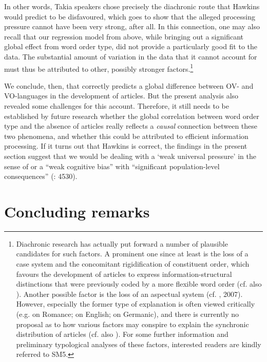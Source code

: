 \documentclass[output=paper]{langsci/langscibook}
\begin{document}
In other words, Takia speakers chose precisely the diachronic route that Hawkins would predict to be disfavoured, which goes to show that the alleged processing pressure cannot have been very strong, after all. In this connection, one may also recall that our regression model from above, while bringing out a significant global effect from word order type, did not provide a particularly good fit to the data. The substantial amount of variation in the data that it cannot account for must thus be attributed to other, possibly stronger factors.\footnote{Diachronic research has actually put forward a number of plausible candidates for such factors. A prominent one since at least \citet{Vennemann1975} is the loss of a case system and the concomitant rigidification of constituent order, which favours the development of articles to express information-structural distinctions that were previously coded by a more flexible word order (cf. also \citealt{Hawkins2004,HewsonBubenik2006,Fischer2010,CarlierLamiroy2014}). Another possible factor is the loss of an aspectual system (cf. \citealt{Abraham1997,Leiss2000}, 2007). However, especially the former type of explanation is often viewed critically (e.g. \citealt{Selig1992} on Romance;  \citealt{McCollMillar2000} on English; \citealt{Leiss2000} on Germanic), and there is currently no proposal as to how various factors may conspire to explain the synchronic distribution of articles (cf. also \citealt{Lüdtke1991}). For some further information and preliminary typological analyses of these factors, interested readers are kindly referred to SM5.}

We conclude, then, that \citet{Hawkins2014} correctly predicts a global difference between OV- and VO-languages in the development of articles. But the present analysis also revealed some challenges for this account. Therefore, it still needs to be established by future research whether the global correlation between word order type and the absence of articles really reflects a \textit{causal} connection between these two phenomena, and whether this could be attributed to efficient information processing. If it turns out that Hawkins is correct, the findings in the present section suggest that we would be dealing with a ‘weak universal pressure’ in the sense of \citet{Seržant2019tv} or a “weak cognitive bias” with “significant population-level consequences” (\citealt{ThompsonEtAl2016}: 4530).

\section{ Concluding remarks} 
\end{document}
